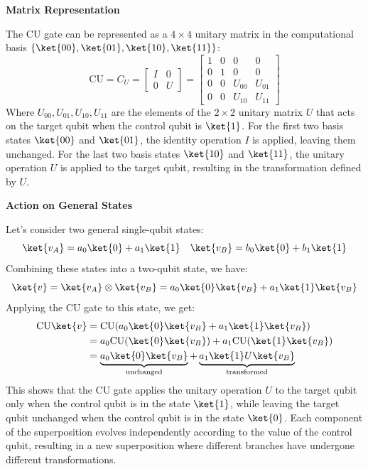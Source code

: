 \highspace
\begin{flushleft}
    \textcolor{Green3}{ \textbf{Matrix Representation}}
\end{flushleft}
The CU gate can be represented as a $4 \times 4$ unitary matrix in the computational basis $\{\ket{00}, \ket{01}, \ket{10}, \ket{11}\}$:
\begin{equation}\label{eq:generic-controlled-gate-matrix}
    \text{CU} = C_{U} =
    \begin{bmatrix}
        I & 0 \\
        0 & U
    \end{bmatrix} =
    \begin{bmatrix}
        1 & 0 & 0 & 0 \\
        0 & 1 & 0 & 0 \\
        0 & 0 & U_{00} & U_{01} \\
        0 & 0 & U_{10} & U_{11}
    \end{bmatrix}
\end{equation}
Where $U_{00}, U_{01}, U_{10}, U_{11}$ are the elements of the $2 \times 2$ unitary matrix $U$ that acts on the target qubit when the control qubit is $\ket{1}$. For the first two basis states $\ket{00}$ and $\ket{01}$, the identity operation $I$ is applied, leaving them unchanged. For the last two basis states $\ket{10}$ and $\ket{11}$, the unitary operation $U$ is applied to the target qubit, resulting in the transformation defined by $U$.

\newpage

\begin{flushleft}
    \textcolor{Green3}{ \textbf{Action on General States}}
\end{flushleft}
Let's consider two general single-qubit states:
\begin{equation*}
    \ket{v_A} = a_0\ket{0} + a_1\ket{1} \quad \ket{v_B} = b_0\ket{0} + b_1\ket{1}
\end{equation*}
Combining these states into a two-qubit state, we have:
\begin{equation*}
    \ket{v} = \ket{v_A} \otimes \ket{v_B} = a_0\ket{0}\ket{v_B} + a_1\ket{1}\ket{v_B}
\end{equation*}
Applying the CU gate to this state, we get:
\begin{align*}
    \text{CU}\ket{v} &= \text{CU}(a_0\ket{0}\ket{v_B} + a_1\ket{1}\ket{v_B}) \\
    &= a_0\text{CU}(\ket{0}\ket{v_B}) + a_1\text{CU}(\ket{1}\ket{v_B}) \\
    &= \underbrace{a_0\ket{0}\ket{v_B}}_{\text{unchanged}} + \underbrace{a_1\ket{1}U\ket{v_B}}_{\text{transformed}}
\end{align*}
This shows that the CU gate applies the unitary operation $U$ to the target qubit only when the control qubit is in the state $\ket{1}$, while leaving the target qubit unchanged when the control qubit is in the state $\ket{0}$. Each component of the superposition evolves independently according to the value of the control qubit, resulting in a new superposition where different branches have undergone different transformations.


